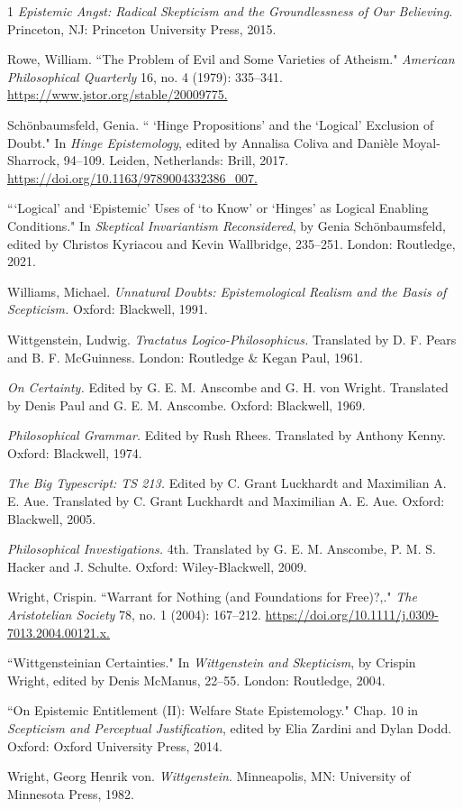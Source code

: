 \begin{hangparas}{\hangingindent}{1}
\emph{Epistemic Angst: Radical Skepticism and the Groundlessness of Our
Believing.} Princeton, NJ: Princeton University Press, 2015.

Rowe,
William. ``The Problem of Evil and Some Varieties of Atheism."
\emph{American Philosophical Quarterly} 16, no. 4 (1979): 335--341.
\url{https://www.jstor.org/stable/20009775.}

Schönbaumsfeld, Genia. `` `Hinge
Propositions' and the `Logical' Exclusion of Doubt." In \emph{Hinge
Epistemology}, edited by Annalisa Coliva and Danièle Moyal-Sharrock,
94--109. Leiden, Netherlands: Brill, 2017.
\url{https://doi.org/10.1163/9789004332386\_007.} 

```Logical' and
`Epistemic' Uses of `to Know' or `Hinges' as Logical Enabling
Conditions." In \emph{Skeptical Invariantism Reconsidered}, by Genia
Schönbaumsfeld, edited by Christos Kyriacou and Kevin Wallbridge,
235--251. London: Routledge, 2021.

Williams, Michael. \emph{Unnatural
Doubts: Epistemological Realism and the Basis of Scepticism.} Oxford:
Blackwell, 1991.

Wittgenstein, Ludwig. \emph{Tractatus
Logico-Philosophicus.} Translated by D. F. Pears and B. F. McGuinness.
London: Routledge \& Kegan Paul, 1961.

\emph{On Certainty.} Edited
by G. E. M. Anscombe and G. H. von Wright. Translated by Denis Paul and
G. E. M. Anscombe. Oxford: Blackwell, 1969. 

\emph{Philosophical
Grammar.} Edited by Rush Rhees. Translated by Anthony Kenny. Oxford:
Blackwell, 1974.

\emph{The Big Typescript: TS 213.} Edited by C.
Grant Luckhardt and Maximilian A. E. Aue. Translated by C. Grant
Luckhardt and Maximilian A. E. Aue. Oxford: Blackwell, 2005.

\emph{Philosophical Investigations.} 4th. Translated by G. E. M.
Anscombe, P. M. S. Hacker and J. Schulte. Oxford: Wiley-Blackwell,
2009.

Wright, Crispin. ``Warrant for Nothing (and Foundations for
Free)?,." \emph{The Aristotelian Society} 78, no. 1 (2004): 167--212.
\url{https://doi.org/10.1111/j.0309-7013.2004.00121.x.}

``Wittgensteinian
Certainties." In \emph{Wittgenstein and Skepticism}, by Crispin Wright,
edited by Denis McManus, 22--55. London: Routledge, 2004. 

``On
Epistemic Entitlement (II): Welfare State Epistemology." Chap. 10 in
\emph{Scepticism and Perceptual Justification}, edited by Elia Zardini
and Dylan Dodd. Oxford: Oxford University Press, 2014.

Wright, Georg
Henrik von. \emph{Wittgenstein}. Minneapolis, MN: University of
Minnesota Press, 1982.
\end{hangparas}